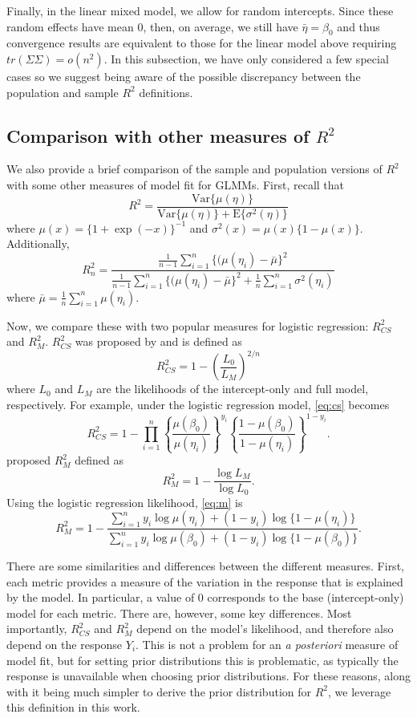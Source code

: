 \documentclass[12pt]{article}
\begin{document}
Finally, in the linear mixed model, we allow for random intercepts. Since these random effects have mean 0, then, on average, we still have $\bar{\eta}=\beta_0$ and thus convergence results are equivalent to those for the linear model above requiring $tr(\Sigma\Sigma)=o(n^2)$. In this subsection, we have only considered a few special cases so we suggest being aware of the possible discrepancy between the population and sample $R^2$ definitions.

\subsection{Comparison with other measures of $R^2$}
We also provide a brief comparison of the sample and population versions of $R^2$ with some other measures of model fit for GLMMs. First, recall that
$$
    R^2=\frac{\mbox{Var}\{\mu(\eta)\}}{\mbox{Var}\{\mu(\eta)\}+\mbox{E}\{\sigma^2(\eta)\}}
$$
where $\mu(x)=\{1+\exp(-x)\}^{-1}$ and $\sigma^2(x)=\mu(x)\{1-\mu(x)\}$. Additionally,
$$
    R^2_n
    =\frac{\frac{1}{n-1}\sum_{i=1}^n \{(\mu(\eta_i)-\bar\mu\}^2}{\frac{1}{n-1}\sum_{i=1}^n \{(\mu(\eta_i)-\bar\mu\}^2 + \frac1n\sum_{i=1}^n \sigma^2(\eta_i)}
$$
where $\bar\mu=\frac1n\sum_{i=1}^n\mu(\eta_i)$.

Now, we compare these with two popular measures for logistic regression: $R^2_{CS}$ and $R^2_M$. $R^2_{CS}$ was proposed by \cite{cox1989analysis} and is defined as
\begin{equation}\label{eq:cs}
    R^2_{CS}
    =1-\left(\frac{L_0}{L_M}\right)^{2/n}
\end{equation}
where $L_0$ and $L_M$ are the likelihoods of the intercept-only and full model, respectively. For example, under the logistic regression model, \eqref{eq:cs} becomes
$$
    R^2_{CS}
    =1- \prod_{i=1}^n \left\{\frac{\mu(\beta_0)}{\mu(\eta_i)}\right\}^{y_i}\left\{\frac{1-\mu(\beta_0)}{1-\mu(\eta_i)}\right\}^{1-y_i}.
$$
\cite{mcfadden1973conditional} proposed $R^2_M$ defined as
\begin{equation}\label{eq:m}
    R^2_M
    =1-\frac{\log L_M}{\log L_0}.
\end{equation}
Using the logistic regression likelihood, \eqref{eq:m} is
$$
    R^2_M= 1-\frac{\sum_{i=1}^n y_i\log\mu(\eta_i)+(1-y_i)\log\{1-\mu(\eta_i)\}}{\sum_{i=1}^n y_i\log\mu(\beta_0)+(1-y_i)\log\{1-\mu(\beta_0)\}}.
$$

There are some similarities and differences between the different measures. First, each metric provides a measure of the variation in the response that is explained by the model. In particular, a value of 0 corresponds to the base (intercept-only) model for each metric. There are, however, some key differences. Most importantly, $R^2_{CS}$ and $R^2_M$ depend on the model's likelihood, and therefore also depend on the response $Y_i$. This is not a problem for an {\it a posteriori} measure of model fit, but for setting prior distributions this is problematic, as typically the response is unavailable when choosing prior distributions. For these reasons, along with it being much simpler to derive the prior distribution for $R^2$, we leverage this definition in this work.
\end{document}
